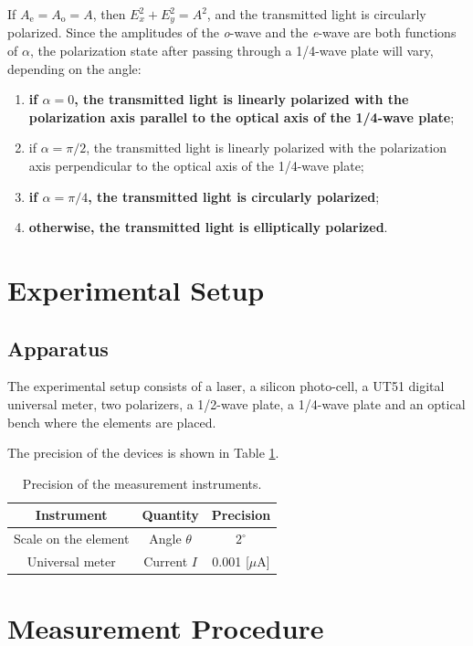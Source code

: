 \documentclass{article}
\begin{document}
If $A_\text{e} = A_\text{o} = A$, then $E^2_x +E^2_y = A^2$, and the transmitted light is circularly polarized. Since the amplitudes of the \textit{o}-wave and the \textit{e}-wave are both functions of $\alpha$, the polarization state after passing through a 1/4-wave plate will vary, depending on the angle: 

\begin{enumerate}[$\blacktriangleright$]
\item \textbf{if $\alpha = 0$, the transmitted light is linearly polarized with the polarization axis parallel to the optical axis of the 1/4-wave plate}; 
\item if $\alpha = \pi/2$, the transmitted light is linearly polarized with the polarization axis perpendicular to the optical axis of the 1/4-wave plate; 
\item \textbf{if $\alpha = \pi/4$, the transmitted light is circularly polarized}; 
\item \textbf{otherwise, the transmitted light is elliptically polarized}.
\end{enumerate}

\section{Experimental Setup}

\subsection{Apparatus}\label{Apparatus}
The experimental setup consists of a laser, a silicon photo-cell, a UT51 digital universal meter, two polarizers, a 1/2-wave plate, a 1/4-wave plate and an optical bench where the elements are placed.

The precision of the devices is shown in Table \ref{tablePresicion}.

\begin{table}[H]
\centering
\begin{tabular}{ccc}
\toprule
Instrument & Quantity & Precision\\
\midrule
Scale on the element & Angle $\theta$ & $2^\circ$\\
 Universal meter & Current $I$ & 0.001 [$\mu$A]\\
\bottomrule
\end{tabular}
\caption{Precision of the measurement instruments.}\label{tablePresicion}
\end{table}

\section{Measurement Procedure}
\end{document}
